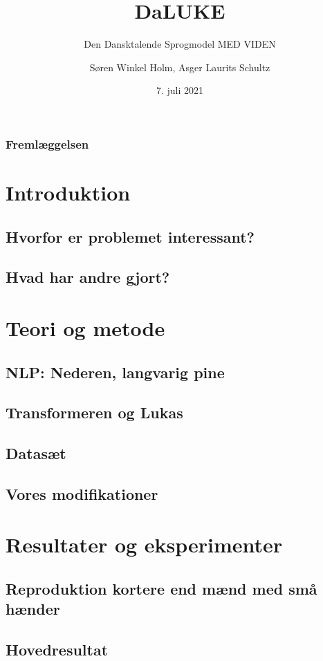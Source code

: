 \documentclass{beamer}
\title{DaLUKE}
\subtitle{
    Den Dansktalende Sprogmodel MED VIDEN
}
\author[Søren Holm, Asger Schultz]{Søren Winkel Holm, Asger Laurits Schultz}
\institute[DTU]{Danmarks Tekniske Universitet}
\date{7. juli 2021}
\begin{document}
\begin{frame}
    \titlepage
\end{frame}

\begin{frame}
    \frametitle{Fremlæggelsen}
    \footnotesize
    \tableofcontents
\end{frame}

\section{Introduktion}
\subsection{Hvorfor er problemet interessant?}
\subsection{Hvad har andre gjort?}

\section{Teori og metode}
\subsection{NLP: Nederen, langvarig pine}
\subsection{Transformeren og Lukas}
\subsection{Datasæt}
\subsection{Vores modifikationer}

\section{Resultater og eksperimenter}
\subsection{Reproduktion kortere end mænd med små hænder}
\subsection{Hovedresultat}
\end{document}
